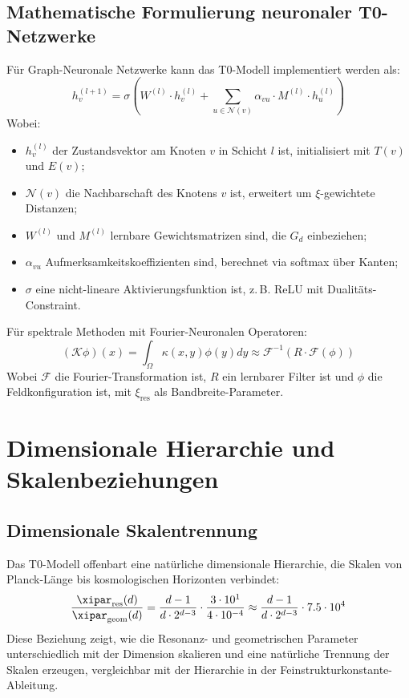 \subsection{Mathematische Formulierung neuronaler T0-Netzwerke}
\label{subsec:mathematical_neural}
Für Graph-Neuronale Netzwerke kann das T0-Modell implementiert werden als:
\begin{equation}
	h_v^{(l+1)} = \sigma\left(W^{(l)} \cdot h_v^{(l)} + \sum_{u \in \mathcal{N}(v)} \alpha_{vu} \cdot M^{(l)} \cdot h_u^{(l)}\right)
\end{equation}
Wobei:
\begin{itemize}
	\item $h_v^{(l)}$ der Zustandsvektor am Knoten $v$ in Schicht $l$ ist, initialisiert mit $T(v)$ und $E(v)$;
	\item $\mathcal{N}(v)$ die Nachbarschaft des Knotens $v$ ist, erweitert um $\xi$-gewichtete Distanzen;
	\item $W^{(l)}$ und $M^{(l)}$ lernbare Gewichtsmatrizen sind, die $G_d$ einbeziehen;
	\item $\alpha_{vu}$ Aufmerksamkeitskoeffizienten sind, berechnet via softmax über Kanten;
	\item $\sigma$ eine nicht-lineare Aktivierungsfunktion ist, z.\,B. ReLU mit Dualitäts-Constraint.
\end{itemize}
Für spektrale Methoden mit Fourier-Neuronalen Operatoren:
\begin{equation}
	(\mathcal{K}\phi)(x) = \int_{\Omega} \kappa(x,y) \phi(y) dy \approx \mathcal{F}^{-1}(R \cdot \mathcal{F}(\phi))
\end{equation}
Wobei $\mathcal{F}$ die Fourier-Transformation ist, $R$ ein lernbarer Filter ist und $\phi$ die Feldkonfiguration ist, mit $\xi_{\text{res}}$ als Bandbreite-Parameter.
\section{Dimensionale Hierarchie und Skalenbeziehungen}
\label{sec:dimensional_hierarchy}
\subsection{Dimensionale Skalentrennung}
\label{subsec:scale_separation}
Das T0-Modell offenbart eine natürliche dimensionale Hierarchie, die Skalen von Planck-Länge bis kosmologischen Horizonten verbindet:
\begin{equation}
	\frac{\xipar_{\text{res}}(d)}{\xipar_{\text{geom}}(d)} = \frac{d-1}{d \cdot 2^{d-3}} \cdot \frac{3 \cdot 10^1}{4 \cdot 10^{-4}} \approx \frac{d-1}{d \cdot 2^{d-3}} \cdot 7.5 \cdot 10^4
\end{equation}
Diese Beziehung zeigt, wie die Resonanz- und geometrischen Parameter unterschiedlich mit der Dimension skalieren und eine natürliche Trennung der Skalen erzeugen, vergleichbar mit der Hierarchie in der Feinstrukturkonstante-Ableitung.
